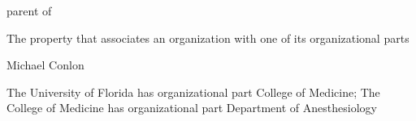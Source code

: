 \documentclass[letterpaper,10pt,english]{sphinxmanual}
\begin{document}
\begin{sphinxShadowBox}

\sphinxAtStartPar
parent of
\end{sphinxShadowBox}

\begin{sphinxShadowBox}

\sphinxAtStartPar
{}
\end{sphinxShadowBox}

\begin{sphinxShadowBox}

\sphinxAtStartPar
The property that associates an organization with one of its organizational parts
\end{sphinxShadowBox}

\begin{sphinxShadowBox}

\sphinxAtStartPar
Michael Conlon 
\end{sphinxShadowBox}

\begin{sphinxShadowBox}

\sphinxAtStartPar
{\hyperref[\detokenize{doc-ORG_0000001::doc}]{}}
\end{sphinxShadowBox}

\begin{sphinxShadowBox}

\sphinxAtStartPar
{\hyperref[\detokenize{doc-ORG_0000005::doc}]{}}
\end{sphinxShadowBox}

\begin{sphinxShadowBox}

\sphinxAtStartPar
{\hyperref[\detokenize{doc-ORG_2000010::doc}]{}}
\end{sphinxShadowBox}

\begin{sphinxShadowBox}

\sphinxAtStartPar
The University of Florida has organizational part College of Medicine; The College of Medicine has organizational part Department of Anesthesiology
\end{sphinxShadowBox}
\end{document}
